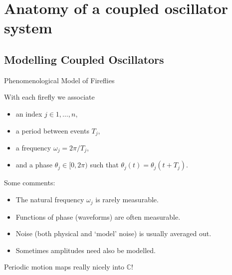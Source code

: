 \documentclass[10pt,reqno]{beamer}
\newcommand{\complex}{\mathbb{C}}
\begin{document}
\section{Anatomy of a coupled oscillator system}
\subsection{Modelling Coupled Oscillators}
\begin{frame}{Phenomenological Model of Fireflies}
\begin{minipage}{0.46\textwidth}
\begin{figure}
\end{figure}
\end{minipage}\hfill
\begin{minipage}{0.46\textwidth}
With each firefly we associate
\begin{itemize}
	\item an index $j \in 1,\ldots,n$, 
	\item a period between events $T_j$,
	\item a frequency $\omega_j = 2\pi/T_j$,
	\item and a phase $\theta_j \in [0,2\pi)$  such that $\theta_j(t) = \theta_j(t+T_j)$.
\end{itemize}
\end{minipage}

\vspace{15pt}

Some comments:
\begin{itemize}
	\item The natural frequency $\omega_j$ is rarely measurable.
	\item Functions of phase (waveforms) are often measurable.
	\item Noise (both physical and `model' noise) is usually averaged out.
	\item Sometimes amplitudes need also be modelled.
\end{itemize}

\begin{center}
	\vfill
Periodic motion maps really nicely into $\complex$!
\end{center}
\end{frame}
\end{document}
